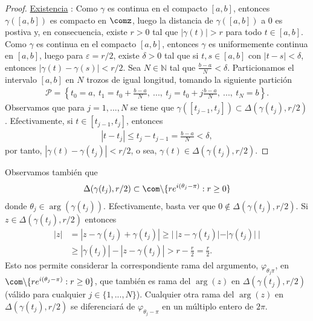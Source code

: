 \begin{proof}
\underline{Existencia} : Como $\gamma$ es continua en el compacto $[a,b]$, entonces $\gamma([a,b])$ es compacto en $\comz$, luego la distancia de $\gamma([a,b])$ a $0$ es postiva y, en consecuencia, existe $r > 0$ tal que $|\gamma(t)| > r$ para todo $t \in [a,b]$.
\\
\newline
Como $\gamma$ es continua en el compacto $[a,b]$, entonces $\gamma$ es uniformemente continua en $[a,b]$, luego para $\varepsilon = r/2$, existe $\delta > 0$ tal que si $t,s \in [a,b]$ con $|t - s| < \delta$, entonces $|\gamma(t) - \gamma(s)| < r/2$. Sea $N \in \mathbb{N}$ tal que $\frac{b - a}{N} < \delta$. Particionamos el intervalo $[a,b]$ en $N$ trozos de igual longitud, tomando la siguiente partición
\begin{align*}
    \mathcal{P} = \left\{ t_0 = a, \ t_1 = t_0 + \frac{b - a}{N}, \ ..., \ t_j = t_0 + j\frac{b - a}{N}, \ ..., \ t_N = b \right\}.
\end{align*}
Observamos que para $j = 1,...,N$ se tiene que $\gamma([t_{j-1}, t_j]) \subset \Delta(\gamma(t_j), r/2)$. Efectivamente, si $t \in [t_{j-1},t_j]$, entonces 
\begin{align*}
    |t - t_j| \leq t_j - t_{j-1} = \frac{b - a}{N} < \delta,
\end{align*}
por tanto, $|\gamma(t) - \gamma(t_j)| < r/2$, o sea, $\gamma(t) \in \Delta(\gamma(t_j), r/2)$.
\end{proof}
Observamos también que
\begin{align*}
    \Delta(\gamma(t_j), r/2) \subset \com \backslash \{ re^{i(\theta_j - \pi)} : r \ge 0\}
\end{align*}
donde $\theta_j \in \arg(\gamma(t_j))$. Efectivamente, basta ver que $0 \not \in \Delta(\gamma(t_j), r/2)$. Si $z \in \Delta(\gamma(t_j), r/2)$ entonces
\begin{align*}
    |z| &= |z - \gamma(t_j) + \gamma(t_j)| \ge | \ |z - \gamma(t_j)| - |\gamma(t_j)| \ | \\
    & \ge |\gamma(t_j)| - |z - \gamma(t_j)| > r - \frac{r}{2} = \frac{r}{2}.
\end{align*}
Esto nos permite considerar la correspondiente rama del argumento, $\varphi_{\theta_j \pi}$, en $\com \backslash \{ re^{i(\theta_j - \pi)} : r \ge 0\}$, que también es rama del $\arg(z)$ en $\Delta(\gamma(t_j), r/2)$ (válido para cualquier $j \in \{1,...,N\}$). Cualquier otra rama del $\arg(z)$ en $\Delta(\gamma(t_j), r/2)$ se diferenciará de $\varphi_{\theta_j - \pi}$ en un múltiplo entero de $2\pi$.
